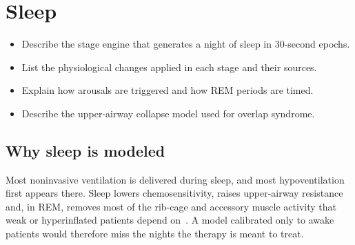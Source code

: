 \chapter{Sleep}
\label{ch:ch11}

\begin{objectives}
\begin{itemize}[leftmargin=*]
  \item Describe the stage engine that generates a night of sleep in 30-second epochs.
  \item List the physiological changes applied in each stage and their sources.
  \item Explain how arousals are triggered and how REM periods are timed.
  \item Describe the upper-airway collapse model used for overlap syndrome.
\end{itemize}
\end{objectives}

\section{Why sleep is modeled}
\label{sec:sl-why}
Most noninvasive ventilation is delivered during sleep, and most hypoventilation first appears there. Sleep lowers chemosensitivity, raises upper-airway resistance and, in REM, removes most of the rib-cage and accessory muscle activity that weak or hyperinflated patients depend on~\citep{douglas1982,white2005}. A model calibrated only to awake patients would therefore miss the nights the therapy is meant to treat.

